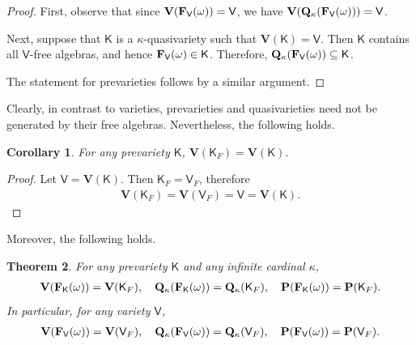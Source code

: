 \documentclass[submission,copyright,creativecommons]{eptcs}
\newtheorem{theorem}{Theorem}[section]
\newtheorem{cor}[theorem]{Corollary}
\theoremstyle{definition}
\newcommand{\alg}[1]{{{\textbf{\upshape #1}}}}
\newcommand{\VV}{\mathbf{V}}
\newcommand{\QQ}{\mathbf{Q}}
\newcommand{\PR}{\mathbf{P}}
\newcommand{\vv}[1]{\mathsf {#1}}
\newcommand{\FrV}{\alg F_\vv V(\omega)}
\newcommand{\kk}{\kappa}
\begin{document}
\begin{proof}
	First, observe that since $\VV(\FrV) = \vv V$, we have $\VV(\QQ_\kk(\FrV)) = \vv V$.

	Next, suppose that $\vv K$ is a $\kk$-quasivariety such that $\VV(\vv K) = \vv V$. Then $\vv K$ contains all $\vv V$-free algebras, and hence $\FrV \in \vv K$. Therefore, $\QQ_\kk(\FrV) \subseteq \vv K$.
	
	The statement for prevarieties follows by a similar argument.
	\end{proof}
	
Clearly, in contrast to varieties, prevarieties and quasivarieties need not be generated by their free algebras. Nevertheless, the following holds.

\begin{cor}
	For any prevariety $\vv K$, $\VV(\vv K_F) = \VV(\vv K)$.
\end{cor}
\begin{proof}
	Let $\vv V = \VV(\vv K)$. Then $\vv K_F = \vv V_F$, therefore
	\begin{align*}
		\VV(\vv K_F) = \VV(\vv V_F) = \vv V = \VV(\vv K).
	\end{align*}
\end{proof}


Moreover, the following holds.

\begin{theorem}\label{th-freesame}
	For any prevariety $\vv K$ and any infinite cardinal $\kk$,
	\begin{align*}
		\VV(\alg F_\vv K(\omega)) = \VV(\vv K_F), \quad
		\QQ_\kk(\alg F_\vv K(\omega)) = \QQ_\kk(\vv K_F), \quad
		\PR(\alg F_\vv K(\omega)) = \PR(\vv K_F).
	\end{align*}
	In particular, for any variety $\vv V$,
	\begin{align*}
		\VV(\FrV) = \VV(\vv V_F), \quad
		\QQ_\kk(\FrV) = \QQ_\kk(\vv V_F), \quad
		\PR(\FrV) = \PR(\vv V_F).
	\end{align*}
\end{theorem}
\end{document}
